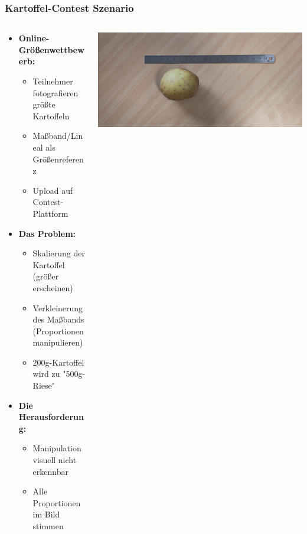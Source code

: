 \documentclass[11pt,t,usepdftitle=false,aspectratio=169]{beamer}
\begin{document}
\begin{frame}
	\frametitle{Kartoffel-Contest Szenario}
	\begin{columns}[T]
		\begin{column}{0.6\textwidth}
			\begin{itemize}
				\item \textbf{Online-Größenwettbewerb:} 
				\begin{itemize}
					\item Teilnehmer fotografieren größte Kartoffeln
					\item Maßband/Lineal als Größenreferenz
					\item Upload auf Contest-Plattform
				\end{itemize}
				\item \textbf{Das Problem:} 
				\begin{itemize}
					\item Skalierung der Kartoffel (größer erscheinen)
					\item Verkleinerung des Maßbands (Proportionen manipulieren)
					\item 200g-Kartoffel wird zu "500g-Riese"
				\end{itemize}
				\item \textbf{Die Herausforderung:} 
				\begin{itemize}
					\item Manipulation visuell nicht erkennbar
					\item Alle Proportionen im Bild stimmen
				\end{itemize}
			\end{itemize}
		\end{column}
		\begin{column}{0.38\textwidth}
			\centering
			\includegraphics[width=\textwidth]{images/image_2.jpg}
			\vspace{0.5cm}
			

\end{column}
\end{columns}
\end{frame}
\end{document}
